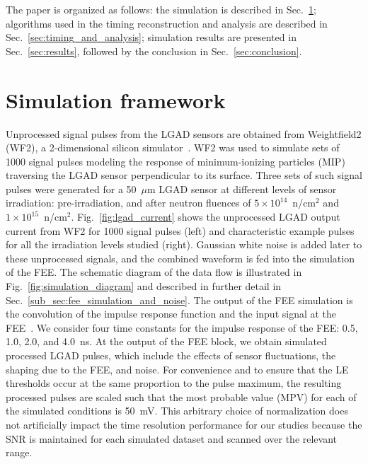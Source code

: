 \documentclass[preprint,1p]{elsarticle}
\begin{document}
The paper is organized as follows: the simulation is described in
Sec.~\ref{sec:simulation}; algorithms used in the timing
reconstruction and analysis are described in Sec.~\ref{sec:timing_and_analysis}; simulation results
are presented in Sec.~\ref{sec:results}, followed by the conclusion in
Sec.~\ref{sec:conclusion}.

\section{Simulation framework}
\label{sec:simulation}

Unprocessed signal pulses from the LGAD sensors are obtained from Weightfield2
(WF2), a 2-dimensional silicon simulator~\cite{Sadrozinski:2017qpv}. WF2 was
used to simulate sets of 1000 signal pulses modeling the response of
minimum-ionizing particles (MIP) traversing the LGAD sensor perpendicular to its surface. 
Three sets of such signal pulses were generated for a 50~$\mu$m LGAD sensor at different levels of sensor
irradiation: pre-irradiation, and after neutron fluences of $5\times
10^{14}$~n/cm$^2$ and $1\times 10^{15}$~n/cm$^2$. Fig.~\ref{fig:lgad_current} shows the
unprocessed LGAD output current from WF2 for 1000 signal pulses (left)
and characteristic example pulses for all the irradiation levels studied (right).
Gaussian white noise is added later
to these unprocessed signals, and the combined waveform is fed into the
simulation of the FEE. The schematic diagram of the data flow is illustrated
in Fig.~\ref{fig:simulation_diagram} and described in further detail in
Sec.~\ref{sub_sec:fee_simulation_and_noise}. The output of the FEE simulation is
the convolution of the impulse response function and the input signal at the
FEE~\cite{Sansen}. We consider four time constants for the impulse response of the FEE:
0.5, 1.0, 2.0, and 4.0~\si{ns}. At the output of the FEE block, we obtain
simulated processed LGAD pulses, which include the effects of sensor
fluctuations, the shaping due to the FEE, and noise. For convenience
and to ensure that the LE thresholds occur at the same proportion to the pulse maximum,
the resulting processed pulses are scaled such that the most probable value (MPV) for each of the 
simulated conditions is 50~\si{mV}. This arbitrary choice of normalization does not artificially
impact the time resolution performance for our studies because the SNR is maintained
for each simulated dataset and scanned over the relevant range. 
\end{document}
